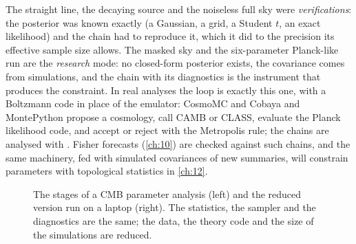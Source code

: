 \begin{inpractice}
The straight line, the decaying source and the noiseless full sky were \emph{verifications}: the posterior was known
exactly (a Gaussian, a grid, a Student $t$, an exact likelihood) and the chain had to reproduce it, which it did to the
precision its effective sample size allows. The masked sky and the six-parameter Planck-like run are the \emph{research}
mode: no closed-form posterior exists, the covariance comes from simulations, and the chain with its diagnostics is the
instrument that produces the constraint. In real analyses the loop is exactly this one, with a Boltzmann code in place of
the emulator: CosmoMC and Cobaya \cite{LewisBridle2002,Torrado2021} and MontePython \cite{Audren2013} propose a cosmology,
call CAMB or CLASS, evaluate the Planck likelihood code, and accept or reject with the Metropolis rule; the chains are
analysed with . Fisher forecasts (\cref{ch:10}) are checked against such chains, and the same machinery,
fed with simulated covariances of new summaries, will constrain parameters with topological statistics in \cref{ch:12}.
\end{inpractice}

\begin{figure}[htbp]
\centering
{}
\caption{The stages of a CMB parameter analysis (left) and the reduced version run on a laptop (right). The
statistics, the sampler and the diagnostics are the same; the data, the theory code and the size of the simulations
are reduced.}
\label{9c:fig:pipeline}
\end{figure}

